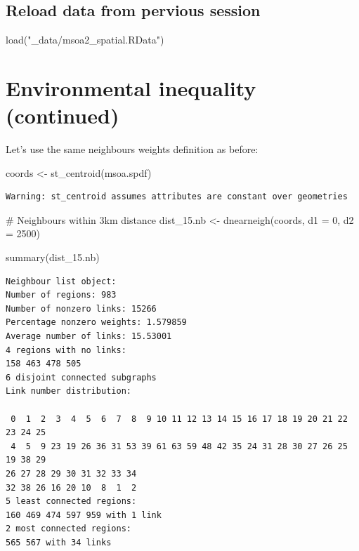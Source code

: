 \documentclass[
  letterpaper,
]{scrbook}
\newenvironment{Shaded}{\begin{snugshade}}{\end{snugshade}}
\newcommand{\AttributeTok}[1]{\textcolor[rgb]{0.40,0.45,0.13}{#1}}
\newcommand{\CommentTok}[1]{\textcolor[rgb]{0.37,0.37,0.37}{#1}}
\newcommand{\DecValTok}[1]{\textcolor[rgb]{0.68,0.00,0.00}{#1}}
\newcommand{\FunctionTok}[1]{\textcolor[rgb]{0.28,0.35,0.67}{#1}}
\newcommand{\NormalTok}[1]{\textcolor[rgb]{0.00,0.23,0.31}{#1}}
\newcommand{\OtherTok}[1]{\textcolor[rgb]{0.00,0.23,0.31}{#1}}
\newcommand{\StringTok}[1]{\textcolor[rgb]{0.13,0.47,0.30}{#1}}
\begin{document}
\hypertarget{reload-data-from-pervious-session-9}{%
\subsection*{Reload data from pervious
session}\label{reload-data-from-pervious-session-9}}

\begin{Shaded}
\begin{Highlighting}[]
\FunctionTok{load}\NormalTok{(}\StringTok{"\_data/msoa2\_spatial.RData"}\NormalTok{)}
\end{Highlighting}
\end{Shaded}

\hypertarget{environmental-inequality-continued}{%
\section{Environmental inequality
(continued)}\label{environmental-inequality-continued}}

Let's use the same neighbours weights definition as before:

\begin{Shaded}
\begin{Highlighting}[]
\NormalTok{coords }\OtherTok{\textless{}{-}} \FunctionTok{st\_centroid}\NormalTok{(msoa.spdf)}
\end{Highlighting}
\end{Shaded}

\begin{verbatim}
Warning: st_centroid assumes attributes are constant over geometries
\end{verbatim}

\begin{Shaded}
\begin{Highlighting}[]
\CommentTok{\# Neighbours within 3km distance}
\NormalTok{dist\_15.nb }\OtherTok{\textless{}{-}} \FunctionTok{dnearneigh}\NormalTok{(coords, }\AttributeTok{d1 =} \DecValTok{0}\NormalTok{, }\AttributeTok{d2 =} \DecValTok{2500}\NormalTok{)}

\FunctionTok{summary}\NormalTok{(dist\_15.nb)}
\end{Highlighting}
\end{Shaded}

\begin{verbatim}
Neighbour list object:
Number of regions: 983 
Number of nonzero links: 15266 
Percentage nonzero weights: 1.579859 
Average number of links: 15.53001 
4 regions with no links:
158 463 478 505
6 disjoint connected subgraphs
Link number distribution:

 0  1  2  3  4  5  6  7  8  9 10 11 12 13 14 15 16 17 18 19 20 21 22 23 24 25 
 4  5  9 23 19 26 36 31 53 39 61 63 59 48 42 35 24 31 28 30 27 26 25 19 38 29 
26 27 28 29 30 31 32 33 34 
32 38 26 16 20 10  8  1  2 
5 least connected regions:
160 469 474 597 959 with 1 link
2 most connected regions:
565 567 with 34 links
\end{verbatim}
\end{document}
